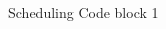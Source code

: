 \documentclass[notes xcolor=dvipsnames]{beamer}
\begin{document}
\begin{frame}{Scheduling Code block 1}
\begin{columns}
\begin{column}{0.5\textwidth}
                \begin{figure}
                \end{figure}
                
            \end{column}


        \end{columns}
        
        

    \end{frame}
\end{document}
